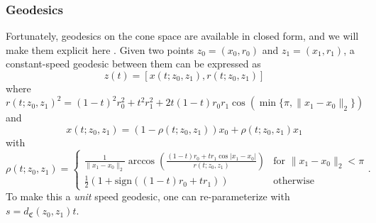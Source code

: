 \documentclass{article}
\begin{document}
\subsubsection{Geodesics}

Fortunately, geodesics on the cone space are available in closed form, and we will make them explicit here \cite{liero2016optimal}. Given two points $z_0 = (x_0, r_0)$ and $z_1 = (x_1, r_1)$, a constant-speed geodesic between them can be expressed as
\begin{equation} \label{eq: cone geodesics}
    z(t) = \left[x(t; z_0, z_1) , r(t; z_0, z_1)\right]
\end{equation}
where
\begin{equation} \label{eq: cone geodesic radial}
    r(t; z_0, z_1)^2 = (1-t)^2r_0^2 + t^2r_1^2 + 2t(1-t)r_0r_1\cos(\min\{\pi, \|x_1 - x_0\|_{2}\})
\end{equation}
and 
\begin{equation} \label{eq: cone geodesic base}
    x(t; z_0, z_1) = (1 - \rho(t; z_0, z_1))x_0 + \rho(t; z_0, z_1)x_1
\end{equation}
with
\begin{equation}
    \rho(t; z_0, z_1) = \begin{cases}
        \frac{1}{\|x_1 - x_0\|_2}\arccos\left(\frac{(1-t)r_0 + tr_1\cos|x_1 - x_0|}{r(t; z_0, z_1)}\right) & \text{for }\|x_1 - x_0\|_2 < \pi \\
        \frac{1}{2}\left(1 + \text{sign}((1-t)r_0 + tr_1)\right) & \text{otherwise}
    \end{cases}.
\end{equation}
To make this a \textit{unit} speed geodesic, one can re-parameterize with $s = d_{\mathfrak{C}}(z_0, z_1)t.$ 
\end{document}
